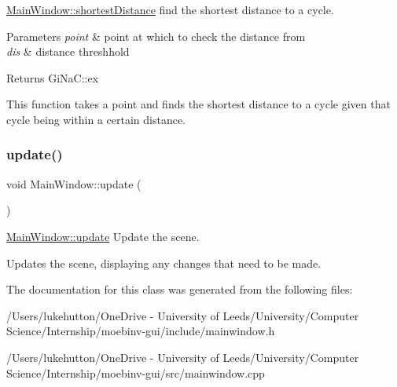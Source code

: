 \mbox{\hyperlink{class_main_window_a2431b3144405d8d0d3e8bd3523ad381b}{Main\+Window\+::shortest\+Distance}} find the shortest distance to a cycle. 


\begin{DoxyParams}{Parameters}
{\em point} & point at which to check the distance from \\
\hline
{\em dis} & distance threshhold \\
\hline
\end{DoxyParams}
\begin{DoxyReturn}{Returns}
Gi\+Na\+C\+::ex
\end{DoxyReturn}
This function takes a point and finds the shortest distance to a cycle given that cycle being within a certain distance. \mbox{\label{class_main_window_a128f71880d4b9683149023fc46fcc9f8}} 
\subsubsection{\texorpdfstring{update()}{update()}}
{\footnotesize\ttfamily void Main\+Window\+::update (\begin{DoxyParamCaption}{ }\end{DoxyParamCaption})}



\mbox{\hyperlink{class_main_window_a128f71880d4b9683149023fc46fcc9f8}{Main\+Window\+::update}} Update the scene. 

Updates the scene, displaying any changes that need to be made. 

The documentation for this class was generated from the following files\+:\begin{DoxyCompactItemize}
\item 
/\+Users/lukehutton/\+One\+Drive -\/ University of Leeds/\+University/\+Computer Science/\+Internship/moebinv-\/gui/include/mainwindow.\+h\item 
/\+Users/lukehutton/\+One\+Drive -\/ University of Leeds/\+University/\+Computer Science/\+Internship/moebinv-\/gui/src/mainwindow.\+cpp\end{DoxyCompactItemize}
